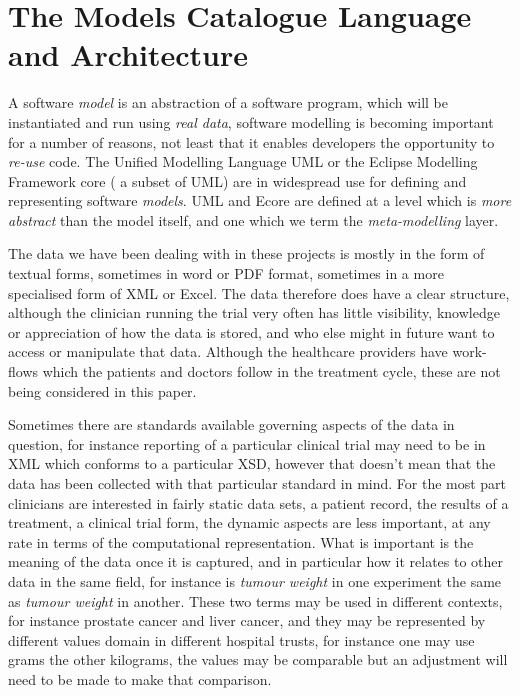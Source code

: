 \section{The Models Catalogue Language and Architecture}
 


A software \emph{model} is an abstraction of a software program, which will be instantiated and run using \emph{real data}, software modelling is becoming important for a number of reasons, not least that it enables developers the opportunity to \emph{re-use} code. The Unified Modelling Language UML \cite{UML} or the Eclipse Modelling Framework core \cite{ECORE} ( a subset of UML) are in widespread use for defining and representing software \emph{models}. UML and Ecore are defined at a level which is \emph{more abstract} than the model itself, and one which we term the \emph{meta-modelling} layer. 

The data we have been dealing with in these projects is mostly in the form of textual forms, sometimes in word or PDF format, sometimes in a more specialised form of XML or Excel. The data therefore does have a clear structure, although the clinician running the trial very often has little visibility, knowledge or appreciation of how the data is stored, and who else might in future want to access or manipulate that data.  Although the healthcare providers have work-flows which the patients and doctors follow in the treatment cycle, these are not being considered in this paper.

Sometimes there are standards available governing aspects of the data in question, for instance reporting of a particular clinical trial may need to be in XML which conforms to a particular XSD, however that doesn't mean that the data has been collected with that particular standard in mind.  For the most part clinicians are interested in fairly static data sets, a patient record, the results of a treatment, a clinical trial form, the dynamic aspects are less important, at any rate in terms of the computational representation. What is important is the meaning of the data once it is captured, and in particular how it relates to other data in the same field, for instance is \emph{tumour weight} in one experiment the same as \emph{tumour weight} in another. These two terms may be used in different contexts, for instance prostate cancer and liver cancer, and they may be represented by different values domain in different hospital trusts, for instance one may use grams the other kilograms, the values may be comparable but an adjustment will need to be made to make that comparison.

